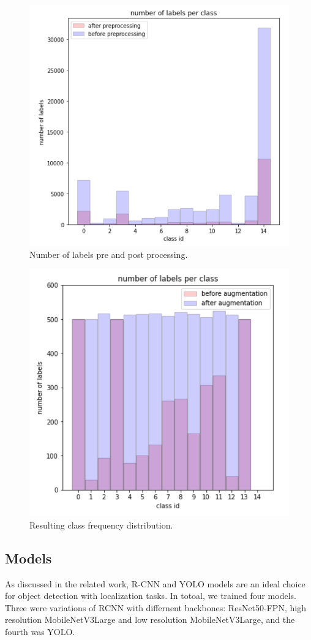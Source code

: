 \documentclass[conference]{IEEEtran}
\begin{document}
\begin{figure}[h]
	\centering
    \includegraphics[width=0.80\linewidth]{label_decrease}
    \caption{Number of labels pre and post processing.}
	\label{fig:label_decrease}
\end{figure}

\begin{figure}[h]
	\centering
    \includegraphics[width=0.80\linewidth]{class_distribution}
    \caption{Resulting class frequency distribution.}
	\label{fig:class_distribution}
\end{figure}

\subsection{Models}
As discussed in the related work, R-CNN and YOLO models are an ideal choice for object detection with localization tasks. In totoal, we trained four models. Three were variations of RCNN with differnent backbones: ResNet50-FPN, high resolution MobileNetV3Large and low resolution MobileNetV3Large, and the fourth was YOLO.
\end{document}
